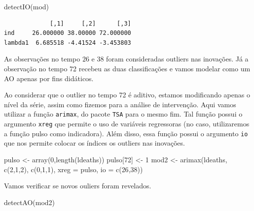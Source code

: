 \documentclass[
  letterpaper,
  DIV=11,
  numbers=noendperiod]{scrartcl}
\newenvironment{Shaded}{\begin{snugshade}}{\end{snugshade}}
\newcommand{\AttributeTok}[1]{\textcolor[rgb]{0.40,0.45,0.13}{#1}}
\newcommand{\DecValTok}[1]{\textcolor[rgb]{0.68,0.00,0.00}{#1}}
\newcommand{\FunctionTok}[1]{\textcolor[rgb]{0.28,0.35,0.67}{#1}}
\newcommand{\NormalTok}[1]{\textcolor[rgb]{0.00,0.23,0.31}{#1}}
\newcommand{\OtherTok}[1]{\textcolor[rgb]{0.00,0.23,0.31}{#1}}
\theoremstyle{definition}
\theoremstyle{definition}
\theoremstyle{plain}
\theoremstyle{plain}
\theoremstyle{remark}
\begin{document}
\begin{Shaded}
\begin{Highlighting}[]
\FunctionTok{detectIO}\NormalTok{(mod)}
\end{Highlighting}
\end{Shaded}

\begin{verbatim}
             [,1]     [,2]      [,3]
ind     26.000000 38.00000 72.000000
lambda1  6.685518 -4.41524 -3.453803
\end{verbatim}

As observações no tempo \(26\) e 38 foram consideradas outliers nas
inovações. Já a observação no tempo 72 recebeu as duas classificações e
vamos modelar como um AO apenas por fins didáticos.

Ao considerar que o outlier no tempo 72 é aditivo, estamos modificando
apenas o nível da série, assim como fizemos para a análise de
intervenção. Aqui vamos utilizar a função \texttt{arimax}, do pacote
\texttt{TSA} para o mesmo fim. Tal função possui o argumento
\texttt{xreg} que permite o uso de variáveis regressoras (no caso,
utilizaremos a função pulso como indicadora). Além disso, essa função
possui o argumento \texttt{io} que nos permite colocar os índices os
outliers nas inovações.

\begin{Shaded}
\begin{Highlighting}[]
\NormalTok{pulso }\OtherTok{\textless{}{-}} \FunctionTok{array}\NormalTok{(}\DecValTok{0}\NormalTok{,}\FunctionTok{length}\NormalTok{(ldeaths))}
\NormalTok{pulso[}\DecValTok{72}\NormalTok{] }\OtherTok{\textless{}{-}} \DecValTok{1}
\NormalTok{mod2 }\OtherTok{\textless{}{-}} \FunctionTok{arimax}\NormalTok{(ldeaths, }\FunctionTok{c}\NormalTok{(}\DecValTok{2}\NormalTok{,}\DecValTok{1}\NormalTok{,}\DecValTok{2}\NormalTok{), }\FunctionTok{c}\NormalTok{(}\DecValTok{0}\NormalTok{,}\DecValTok{1}\NormalTok{,}\DecValTok{1}\NormalTok{), }\AttributeTok{xreg =}\NormalTok{ pulso, }\AttributeTok{io =} \FunctionTok{c}\NormalTok{(}\DecValTok{26}\NormalTok{,}\DecValTok{38}\NormalTok{))}
\end{Highlighting}
\end{Shaded}

Vamos verificar se novos ouliers foram revelados.

\begin{Shaded}
\begin{Highlighting}[]
\FunctionTok{detectAO}\NormalTok{(mod2)}
\end{Highlighting}
\end{Shaded}
\end{document}
